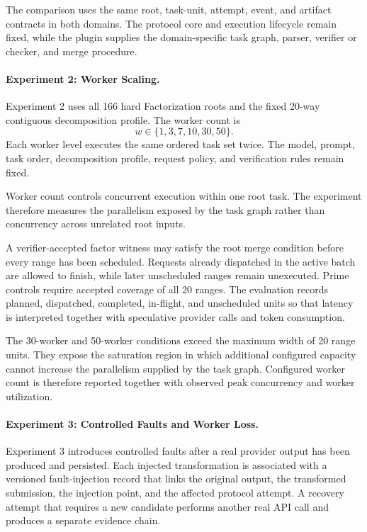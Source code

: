 \documentclass{article}
\theoremstyle{plain}
\begin{document}
The comparison uses the same root, task-unit, attempt, event, and artifact
contracts in both domains. The protocol core and execution lifecycle remain
fixed, while the plugin supplies the domain-specific task graph, parser,
verifier or checker, and merge procedure.


\paragraph{Experiment 2: Worker Scaling.}

Experiment 2 uses all 166 hard Factorization roots and the fixed 20-way
contiguous decomposition profile. The worker count is
\[
w\in\{1,3,7,10,30,50\}.
\]
Each worker level executes the same ordered task set twice. The model,
prompt, task order, decomposition profile, request policy, and verification
rules remain fixed.

Worker count controls concurrent execution within one root task. The
experiment therefore measures the parallelism exposed by the task graph
rather than concurrency across unrelated root inputs.

A verifier-accepted factor witness may satisfy the root merge condition
before every range has been scheduled. Requests already dispatched in the
active batch are allowed to finish, while later unscheduled ranges remain
unexecuted. Prime controls require accepted coverage of all 20 ranges.
The evaluation records planned, dispatched, completed, in-flight, and
unscheduled units so that latency is interpreted together with speculative
provider calls and token consumption.

The 30-worker and 50-worker conditions exceed the maximum width of
20 range units. They expose the saturation region in which additional
configured capacity cannot increase the parallelism supplied by the task
graph. Configured worker count is therefore reported together with
observed peak concurrency and worker utilization.


\paragraph{Experiment 3: Controlled Faults and Worker Loss.}

Experiment 3 introduces controlled faults after a real provider output has
been produced and persisted. Each injected transformation is associated
with a versioned fault-injection record that links the original output,
the transformed submission, the injection point, and the affected
protocol attempt. A recovery attempt that requires a new candidate performs
another real API call and produces a separate evidence chain.
\end{document}
